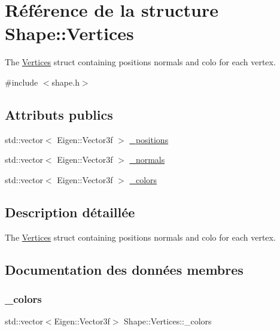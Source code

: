 \hypertarget{struct_shape_1_1_vertices}{}\section{Référence de la structure Shape\+:\+:Vertices}
\label{struct_shape_1_1_vertices}


The \hyperlink{struct_shape_1_1_vertices}{Vertices} struct containing positions normals and colo for each vertex.  




{\ttfamily \#include $<$shape.\+h$>$}

\subsection*{Attributs publics}
\begin{DoxyCompactItemize}
\item 
std\+::vector$<$ Eigen\+::\+Vector3f $>$ \hyperlink{struct_shape_1_1_vertices_aef6a4c183b595cffa5e890e3ba06c64d}{\+\_\+positions}
\item 
std\+::vector$<$ Eigen\+::\+Vector3f $>$ \hyperlink{struct_shape_1_1_vertices_aa258b760267bf6e5b316ac6ec11a2ea3}{\+\_\+normals}
\item 
std\+::vector$<$ Eigen\+::\+Vector3f $>$ \hyperlink{struct_shape_1_1_vertices_a4f3730170f6a9b58be002ea913926e4a}{\+\_\+colors}
\end{DoxyCompactItemize}


\subsection{Description détaillée}
The \hyperlink{struct_shape_1_1_vertices}{Vertices} struct containing positions normals and colo for each vertex. 

\subsection{Documentation des données membres}
\mbox{\label{struct_shape_1_1_vertices_a4f3730170f6a9b58be002ea913926e4a}} 
\subsubsection{\texorpdfstring{\+\_\+colors}{\_colors}}
{\footnotesize\ttfamily std\+::vector$<$Eigen\+::\+Vector3f$>$ Shape\+::\+Vertices\+::\+\_\+colors}

